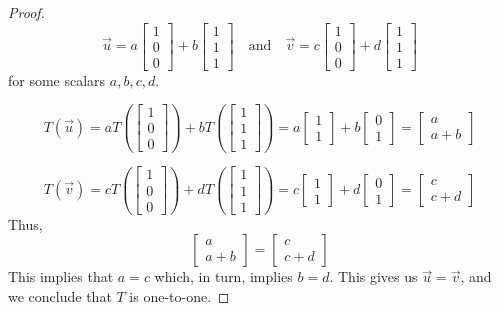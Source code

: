 \documentclass{ximera}
\begin{document}
\begin{example}
\begin{proof}
$$\vec{u}=a\begin{bmatrix}1\\0\\0\end{bmatrix}+b\begin{bmatrix}1\\1\\1\end{bmatrix}\quad\text{and}\quad \vec{v}=c\begin{bmatrix}1\\0\\0\end{bmatrix}+d\begin{bmatrix}1\\1\\1\end{bmatrix}$$
for some scalars $a, b, c, d$.

$$T(\vec{u})=aT\left(\begin{bmatrix}1\\0\\0\end{bmatrix}\right)+bT\left(\begin{bmatrix}1\\1\\1\end{bmatrix}\right)=a\begin{bmatrix}1\\1\end{bmatrix}+b\begin{bmatrix}0\\1\end{bmatrix}=\begin{bmatrix}a\\a+b\end{bmatrix}$$

$$T(\vec{v})=cT\left(\begin{bmatrix}1\\0\\0\end{bmatrix}\right)+dT\left(\begin{bmatrix}1\\1\\1\end{bmatrix}\right)=c\begin{bmatrix}1\\1\end{bmatrix}+d\begin{bmatrix}0\\1\end{bmatrix}=\begin{bmatrix}c\\c+d\end{bmatrix}$$
Thus,
$$\begin{bmatrix}a\\a+b\end{bmatrix}=\begin{bmatrix}c\\c+d\end{bmatrix}$$
This implies that $a=c$ which, in turn, implies $b=d$.  This gives us $\vec{u}=\vec{v}$, and we conclude that $T$ is one-to-one.


\end{proof}
\end{example}
\end{document}
